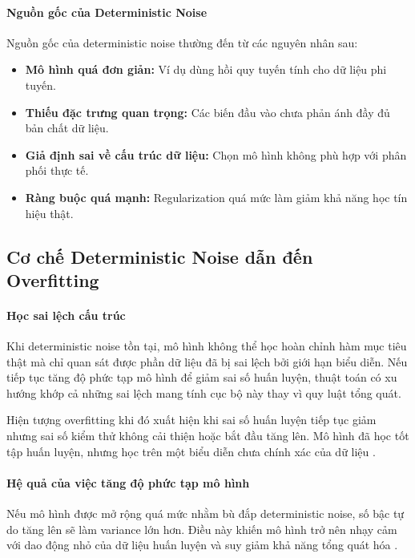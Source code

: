 \paragraph{Nguồn gốc của Deterministic Noise}

Nguồn gốc của deterministic noise thường đến từ các nguyên nhân sau:

\begin{itemize}
    \item \textbf{Mô hình quá đơn giản:} Ví dụ dùng hồi quy tuyến tính cho dữ liệu phi tuyến.
    \item \textbf{Thiếu đặc trưng quan trọng:} Các biến đầu vào chưa phản ánh đầy đủ bản chất dữ liệu.
    \item \textbf{Giả định sai về cấu trúc dữ liệu:} Chọn mô hình không phù hợp với phân phối thực tế.
    \item \textbf{Ràng buộc quá mạnh:} Regularization quá mức làm giảm khả năng học tín hiệu thật.
\end{itemize}

\subsection{Cơ chế Deterministic Noise dẫn đến Overfitting}

\paragraph{Học sai lệch cấu trúc}

Khi deterministic noise tồn tại, mô hình không thể học hoàn chỉnh hàm mục tiêu thật mà chỉ quan sát được phần dữ liệu đã bị sai lệch bởi giới hạn biểu diễn. Nếu tiếp tục tăng độ phức tạp mô hình để giảm sai số huấn luyện, thuật toán có xu hướng khớp cả những sai lệch mang tính cục bộ này thay vì quy luật tổng quát.

Hiện tượng overfitting khi đó xuất hiện khi sai số huấn luyện tiếp tục giảm nhưng sai số kiểm thử không cải thiện hoặc bắt đầu tăng lên. Mô hình đã học tốt tập huấn luyện, nhưng học trên một biểu diễn chưa chính xác của dữ liệu \cite[p.~326]{Dietterich1995}.

\paragraph{Hệ quả của việc tăng độ phức tạp mô hình}

Nếu mô hình được mở rộng quá mức nhằm bù đắp deterministic noise, số bậc tự do tăng lên sẽ làm variance lớn hơn. Điều này khiến mô hình trở nên nhạy cảm với dao động nhỏ của dữ liệu huấn luyện và suy giảm khả năng tổng quát hóa \cite{Geman_1992}.

